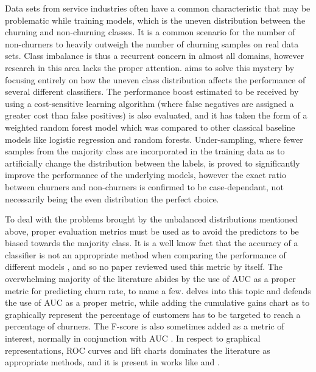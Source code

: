 \documentclass{kththesis}
\begin{document}
Data sets from service industries often have a common characteristic that may be problematic while training models, which is the uneven distribution between the churning and non-churning classes. It is a common scenario for the number of non-churners to heavily outweigh the number of churning samples on real data sets. Class imbalance is thus a recurrent concern in almost all domains, however research in this area lacks the proper attention. \citep{Burez2009} aims to solve this mystery by focusing entirely on how the uneven class distribution affects the performance of several different classifiers. The performance boost estimated to be received by using a cost-sensitive learning algorithm (where false negatives are assigned a greater cost than false positives) is also evaluated, and it has taken the form of a weighted random forest model which was compared to other classical baseline models like logistic regression and random forests. Under-sampling, where fewer samples from the majority class are incorporated in the training data as to artificially change the distribution between the labels, is proved to significantly improve the performance of the underlying models, however the exact ratio between churners and non-churners is confirmed to be case-dependant, not necessarily being the even distribution the perfect choice. 

To deal with the problems brought by the unbalanced distributions mentioned above, proper evaluation metrics must be used as to avoid the predictors to be biased towards the majority class. It is a well know fact that the accuracy of a classifier is not an appropriate method when comparing the performance of different models \citep{powers2011evaluation}, and so no paper reviewed used this metric by itself. The overwhelming majority of the literature abides by the use of AUC as a proper metric for predicting churn rate, \citep{Ballings2012} \citep{GurAli2014} \citep{Khan2015} \citep{Lu2014} to name a few. \citep{Burez2009} delves into this topic and defends the use of AUC as a proper metric, while adding the cumulative gains chart as to graphically represent the percentage of customers has to be targeted to reach a percentage of churners. The F-score is also sometimes added as a metric of interest, normally in conjunction with AUC \citep{Dror2012} \citep{Khan2015}. In respect to graphical representations, ROC curves and lift charts dominates the literature as appropriate methods, and it is present in works like \citep{Lu2014} and \citep{Burez2009}. 
\end{document}
